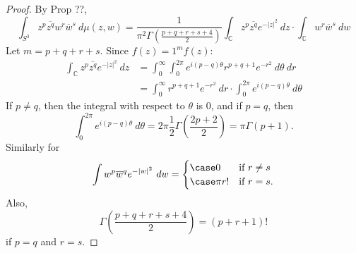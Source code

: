 \documentclass{article}
\begin{document}
\begin{proof}
    By Prop ??, 
    \begin{equation}
        \int_{S^{3}} z^{p} \overline{z^{q}} w^{r} \overline{w}^{s} \ d\mu(z,w)
        =
        \frac{1}{\pi^{2} \Gamma(\frac{p+q+r+s+4}{2})} \int_{\mathbb{C}} z^{p} \overline{z^{q}} e^{-| z |^{2}} \ dz \cdot \int_{\mathbb{C}} w^{r} \overline{w}^{s}  \ dw
    \end{equation}
    Let $m=p+q+r+s$. Since $f(z) = 1^{m}f(z)$:
    \begin{equation}
        \begin{split}
            \int_{\mathbb{C}} z^{p} \overline{z^{q}} e^{-| z |^{2}} \ dz 
            &=
            \int^{\infty}_{0} \int^{2\pi}_{0} e^{i(p-q)\theta} r^{p+q+1} e^{-r^{2}} \ d\theta \ dr \\
            &= 
            \int^{\infty}_{0} r^{p+q+1} e^{-r^{2}}  \ dr \cdot \int^{2\pi}_{0} e^{i(p-q)\theta} \ d\theta
        \end{split}
    \end{equation}
    If $p\neq q$, then the integral with respect to $\theta$ is 0, and if $p=q$, then
    \begin{equation}
        \int^{2\pi}_{0} e^{i(p-q)\theta} \ d\theta 
        =
        2\pi \frac{1}{2} \Gamma (\frac{2p+2}{2}) 
        = \pi \Gamma ({p+1}) .
    \end{equation}
    Similarly for 
    \begin{equation}
        \int w^{p} \overline{w}^{q} e^{-| w |^{2}} \ dw
        =
        \begin{cases}
            \case 0 &\text{if } r\neq s \\
            \case \pi r! & \text{if } r=s. \\
        \end{cases}
    \end{equation}
    Also, 
    \begin{equation}
        \Gamma (\frac{p+q+r+s+4}{2}) = (p+r+1)! 
    \end{equation}
    if $p=q$ and $r=s$.
\end{proof}
\end{document}
